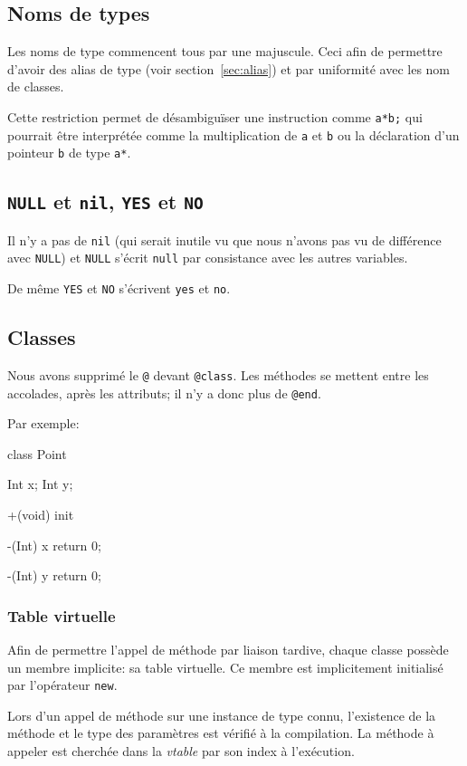 \documentclass{scrartcl}
\begin{document}
  \subsection{Noms de types}
    Les noms de type commencent tous par une majuscule. Ceci afin de permettre
    d'avoir des alias de type (voir section~\ref{sec:alias}) et par uniformité avec
    les nom de classes.

    Cette restriction permet de désambiguïser une instruction comme
    \verb+a*b;+ qui pourrait être interprétée comme la multiplication de
    \verb+a+ et \verb+b+ ou la déclaration d'un pointeur \verb+b+ de type
    \verb+a*+.

  \subsection{\texttt{NULL} et \texttt{nil}, \texttt{YES} et \texttt{NO}}
    Il n'y a pas de \verb+nil+ (qui serait inutile vu que nous n'avons pas vu
    de différence avec \verb+NULL+) et \verb+NULL+ s'écrit \verb+null+ par
    consistance avec les autres variables.

    De même \verb+YES+ et \verb+NO+ s'écrivent \verb+yes+ et \verb+no+.

  \subsection{Classes}
    Nous avons supprimé le \verb+@+ devant \verb+@class+. Les méthodes se
    mettent entre les accolades, après les attributs; il n'y a donc plus de
    \verb+@end+.

    Par exemple:
    \begin{moccode}
class Point {
    Int x;
    Int y;

    +(void) init {
    }

    -(Int) x {
        return 0;
    }

    -(Int) y {
        return 0;
    }
}
    \end{moccode}

    \subsubsection{Table virtuelle}\label{sec:vtable}
      Afin de permettre l'appel de méthode par liaison tardive, chaque classe
      possède un membre implicite: sa table virtuelle. Ce membre est
      implicitement initialisé par l'opérateur \verb+new+.

      Lors d'un appel de méthode sur une instance de type connu, l'existence de
      la méthode et le type des paramètres est vérifié à la compilation. La
      méthode à appeler est cherchée dans la \textit{vtable} par son index à
      l'exécution.
\end{document}

